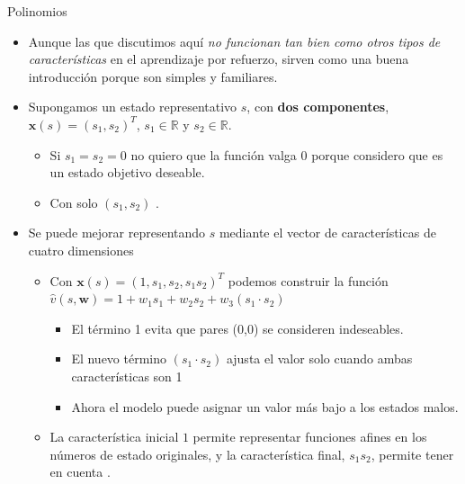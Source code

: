 \documentclass[10pt, envcountsect, handout, aspectratio=1610, hyperref={hypertexnames=true}]{beamer}
\begin{document}
\begin{frame}{Polinomios}
	
	\begin{itemize}
		\item Aunque las  que discutimos aquí \textit{no funcionan tan bien como otros tipos de características} en el aprendizaje por refuerzo, sirven como una buena introducción porque son simples y familiares.
		
		\item Supongamos un estado representativo $s$, con \textbf{dos componentes}, $\mathbf{x}(s) = (s_1, s_2)^T$,  $s_1 \in \mathbb{R}$ y $s_2 \in \mathbb{R}$.
			\begin{itemize}
				\item Si $s_1=s_2=0$ no quiero que la función valga 0 porque considero que es un estado objetivo deseable.

				\item Con solo  $(s_1, s_2)$ .
				
			\end{itemize}
		
		\item Se puede mejorar representando $s$ mediante el vector de características de cuatro dimensiones
			\begin{itemize}
				\item Con $\mathbf{x}(s) = (1, s_1, s_2, s_1 s_2)^T$ podemos construir la función 
				$\hat{v}(s, \mathbf{w}) = 1+  w_1 s_1 + w_2 s_2 + w_3 (s_1 \cdot s_2)$
				
					\begin{itemize}
						\item El término 1 evita que pares (0,0) se consideren indeseables.
						\item El nuevo término \(  (s_1 \cdot s_2) \) ajusta el valor solo cuando ambas características son 1
					
						\item Ahora el modelo puede asignar un valor más bajo a los estados malos.
					\end{itemize}
			\end{itemize}
	
		
		\begin{itemize}
			\item La característica inicial $1$ permite representar funciones afines en los números de estado originales, y la característica final, $s_1 s_2$, permite tener en cuenta .
		\end{itemize}
		

\end{itemize}
\end{frame}
\end{document}

